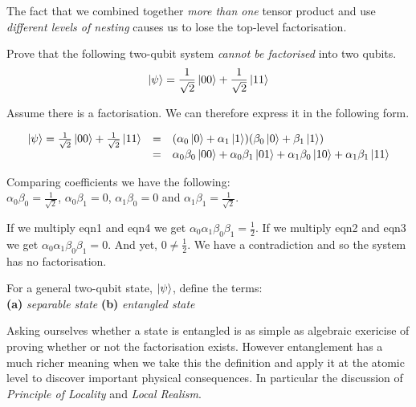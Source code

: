 The fact that we combined together \textit{more than one} tensor product 
and use \textit{different levels of nesting} causes us to lose the 
top-level factorisation. 


\begin{example}
Prove that the following two-qubit system \textit{cannot be factorised}
into two qubits. 
$$\left|\psi\right\rangle = \frac{1}{\sqrt{2}} \left|00\right\rangle + \frac{1}{\sqrt{2}} \left|11\right\rangle$$
\end{example}

\frmrule

Assume there is a factorisation. We can therefore express it in the following form. 

\[ \begin{array}{lll}
\left|\psi\right\rangle = \frac{1}{\sqrt{2}} \left|00\right\rangle + \frac{1}{\sqrt{2}} \left|11\right\rangle 
& = & (\alpha_0 \left|0\right\rangle + \alpha_1 \left|1\right\rangle)(\beta_0 \left|0\right\rangle + \beta_1 \left|1\right\rangle) \\
& = & \alpha_0 \beta_0 \left|00\right\rangle + 
\alpha_0 \beta_1 \left|01\right\rangle + 
\alpha_1 \beta_0 \left|10\right\rangle + 
\alpha_1 \beta_1 \left|11\right\rangle \\
\end{array}\] 

Comparing coefficients we have the following: \\
$\alpha_0 \beta_0 = \frac{1}{\sqrt{2}}$,
$\alpha_0 \beta_1 = 0$,
$\alpha_1 \beta_0 = 0$ and
$\alpha_1 \beta_1 = \frac{1}{\sqrt{2}}$.

If we multiply eqn1 and eqn4 we get $\alpha_0 \alpha_1 \beta_0 \beta_1 = \frac{1}{2}$.
If we multiply eqn2 and eqn3 we get $\alpha_0 \alpha_1 \beta_0 \beta_1 = 0$.
And yet, $0 \neq \frac{1}{2}$. We have a contradiction and so the system has no factorisation. 

\frmrule

\begin{example}
For a general two-qubit state, $\left|\psi\right\rangle$, define the terms: \\
\textbf{(a)} \textit{separable state}
\textbf{(b)} \textit{entangled state}
\end{example}


Asking ourselves whether a state is entangled is as simple as algebraic 
exericise of proving whether or not the factorisation exists. 
However entanglement has a much richer meaning when we take this 
the definition and apply it at the atomic level to discover important physical consequences. 
In particular the discussion of \textit{Principle of Locality} and \textit{Local Realism}.


